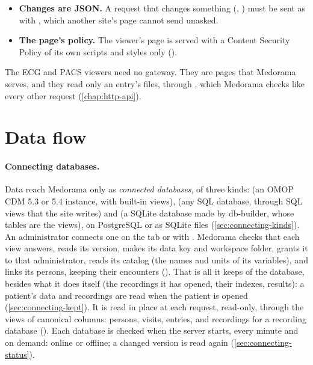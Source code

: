 \begin{itemize}
\item \textbf{Changes are JSON.} A request that changes something (, )
  must be sent as  with , which another site's page
  cannot send unasked.
\item \textbf{The page's policy.} The viewer's page is served with a Content Security Policy of
  its own scripts and styles only ().
\end{itemize}

The ECG and PACS viewers need no gateway. They are pages that Medorama serves, and they read only
an entry's files, through , which Medorama checks like every
other request (\cref{chap:http-api}).

\section{Data flow}
\label{sec:architecture-flow}


\paragraph{Connecting databases.} Data reach Medorama only as \emph{connected databases}, of
three kinds:  (an OMOP CDM 5.3 or 5.4 instance, with built-in views),  (any
SQL database, through SQL views that the site writes) and  (a SQLite database made by
db-builder, whose tables are the views), on PostgreSQL or as SQLite files
(\cref{sec:connecting-kinds}). An administrator connects one on the  tab or with
. Medorama checks that each view answers, reads its version, makes
its data key and workspace folder, grants it to that administrator, reads its catalog (the
names and units of its variables), and links its persons, keeping their encounters
(). That is all it keeps of the database, besides what it does itself (the
recordings it has opened, their indexes, results): a patient's data and recordings are read
when the patient is opened (\cref{sec:connecting-kept}). It is read in place at each request, read-only, through
the views of canonical columns: persons, visits, entries, and recordings for a recording database
(). Each database is checked when the server starts, every minute and
on demand: online or offline; a changed version is read again (\cref{sec:connecting-status}).

